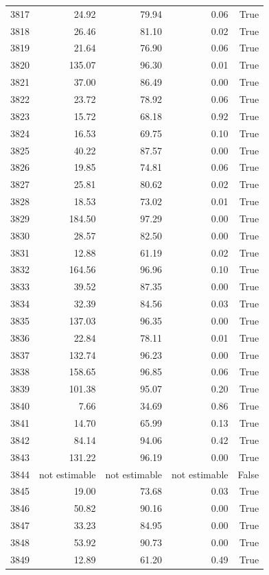 \begin{longtable}{rrrrr}
3817 & 24.92 & 79.94 & 0.06 & True \\
3818 & 26.46 & 81.10 & 0.02 & True \\
3819 & 21.64 & 76.90 & 0.06 & True \\
3820 & 135.07 & 96.30 & 0.01 & True \\
3821 & 37.00 & 86.49 & 0.00 & True \\
3822 & 23.72 & 78.92 & 0.06 & True \\
3823 & 15.72 & 68.18 & 0.92 & True \\
3824 & 16.53 & 69.75 & 0.10 & True \\
3825 & 40.22 & 87.57 & 0.00 & True \\
3826 & 19.85 & 74.81 & 0.06 & True \\
3827 & 25.81 & 80.62 & 0.02 & True \\
3828 & 18.53 & 73.02 & 0.01 & True \\
3829 & 184.50 & 97.29 & 0.00 & True \\
3830 & 28.57 & 82.50 & 0.00 & True \\
3831 & 12.88 & 61.19 & 0.02 & True \\
3832 & 164.56 & 96.96 & 0.10 & True \\
3833 & 39.52 & 87.35 & 0.00 & True \\
3834 & 32.39 & 84.56 & 0.03 & True \\
3835 & 137.03 & 96.35 & 0.00 & True \\
3836 & 22.84 & 78.11 & 0.01 & True \\
3837 & 132.74 & 96.23 & 0.00 & True \\
3838 & 158.65 & 96.85 & 0.06 & True \\
3839 & 101.38 & 95.07 & 0.20 & True \\
3840 & 7.66 & 34.69 & 0.86 & True \\
3841 & 14.70 & 65.99 & 0.13 & True \\
3842 & 84.14 & 94.06 & 0.42 & True \\
3843 & 131.22 & 96.19 & 0.00 & True \\
3844 & not estimable & not estimable & not estimable & False \\
3845 & 19.00 & 73.68 & 0.03 & True \\
3846 & 50.82 & 90.16 & 0.00 & True \\
3847 & 33.23 & 84.95 & 0.00 & True \\
3848 & 53.92 & 90.73 & 0.00 & True \\
3849 & 12.89 & 61.20 & 0.49 & True \\

\end{longtable}
